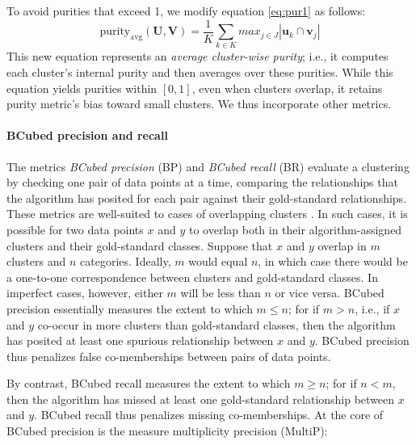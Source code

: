 {To avoid purities that exceed 1, we modify equation \eqref{eq:pur1} as follows: 
\begin{equation} \label{eq:pur2}
\text{purity}_{\text{avg}}(\mathbf{U}, \mathbf{V}) =  \frac{1}{K} \sum_{k \in K} max_{j \in J} |\mathbf{u}_k \cap \mathbf{v}_j|
\end{equation}
This new equation represents an \emph{average cluster-wise purity}; i.e., it computes each cluster's internal purity and then averages over these purities. %
While this equation yields purities within $[0, 1]$, even 
when clusters overlap, it retains %
purity metric's bias toward small clusters. We thus incorporate other metrics. 

\paragraph{BCubed precision and recall}
The metrics \emph{BCubed precision} (BP) and \emph{BCubed recall} (BR) \citep{bagga-and-baldwin:1998} evaluate a clustering by checking one 
pair of data points at a time, comparing the relationships that the algorithm has posited for each pair against their 
gold-standard relationships. These metrics are well-suited to cases of overlapping 
clusters \citep{amigo-et-al:2009}. 
In such cases, it is possible for two data points $x$ and $y$ to overlap both in their algorithm-assigned clusters and their 
gold-standard classes. Suppose that $x$ and $y$ overlap in $m$ clusters and $n$ categories. Ideally, $m$ would 
equal $n$, in which case there would be a one-to-one correspondence between clusters and gold-standard classes. 
In imperfect cases, however, either $m$ will be less than $n$ or vice versa. BCubed precision essentially 
measures the extent to which $m \leq n$; for if $m>n$, i.e., if $x$ and $y$ co-occur in more clusters than gold-standard classes, then the algorithm has posited at least one 
spurious relationship between $x$ and $y$. BCubed precision thus penalizes false co-memberships between pairs of data points.

By contrast, BCubed recall measures the extent to which $m \geq n$; for if $n<m$, then the algorithm 
has missed at least one gold-standard relationship between $x$ and $y$. BCubed recall thus 
penalizes missing co-memberships.
At the core of BCubed precision is the measure multiplicity precision ($\text{MultiP}$):

}
